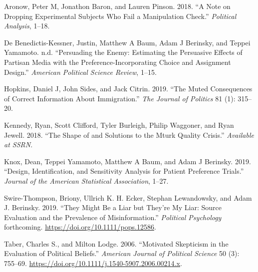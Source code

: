 \documentclass[]{article}
\begin{document}
\hypertarget{refs}{}
\begin{cslreferences}
\leavevmode\hypertarget{ref-aronow2018note}{}%
Aronow, Peter M, Jonathon Baron, and Lauren Pinson. 2018. ``A Note on
Dropping Experimental Subjects Who Fail a Manipulation Check.''
\emph{Political Analysis}, 1--18.

\leavevmode\hypertarget{ref-benedictis2019persuading}{}%
De Benedictis-Kessner, Justin, Matthew A Baum, Adam J Berinsky, and
Teppei Yamamoto. n.d. ``Persuading the Enemy: Estimating the Persuasive
Effects of Partisan Media with the Preference-Incorporating Choice and
Assignment Design.'' \emph{American Political Science Review}, 1--15.

\leavevmode\hypertarget{ref-hopkins2019muted}{}%
Hopkins, Daniel J, John Sides, and Jack Citrin. 2019. ``The Muted
Consequences of Correct Information About Immigration.'' \emph{The
Journal of Politics} 81 (1): 315--20.

\leavevmode\hypertarget{ref-kennedy2018shape}{}%
Kennedy, Ryan, Scott Clifford, Tyler Burleigh, Philip Waggoner, and Ryan
Jewell. 2018. ``The Shape of and Solutions to the Mturk Quality
Crisis.'' \emph{Available at SSRN}.

\leavevmode\hypertarget{ref-knox2019design}{}%
Knox, Dean, Teppei Yamamoto, Matthew A Baum, and Adam J Berinsky. 2019.
``Design, Identification, and Sensitivity Analysis for Patient
Preference Trials.'' \emph{Journal of the American Statistical
Association}, 1--27.

\leavevmode\hypertarget{ref-thompson2019might}{}%
Swire-Thompson, Briony, Ullrich K. H. Ecker, Stephan Lewandowsky, and
Adam J. Berinsky. 2019. ``They Might Be a Liar but They're My Liar:
Source Evaluation and the Prevalence of Misinformation.''
\emph{Political Psychology} forthcoming.
\url{https://doi.org/10.1111/pops.12586}.

\leavevmode\hypertarget{ref-Taber2006}{}%
Taber, Charles S., and Milton Lodge. 2006. ``Motivated Skepticism in the
Evaluation of Political Beliefs.'' \emph{American Journal of Political
Science} 50 (3): 755--69.
\url{https://doi.org/10.1111/j.1540-5907.2006.00214.x}.
\end{cslreferences}
\end{document}
